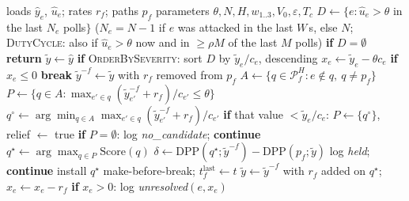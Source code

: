 \begin{algorithm}[t]
\caption{ResilientSDN, one polling interval $t$}\label{alg:rsdn}
\begin{algorithmic}[1]
\Require loads $\hat y_e$, $\hat u_e$; rates $r_f$; paths $p_f$
\Statex \hspace{\algorithmicindent}parameters $\theta,N,H,w_{1..3},V_0,\varepsilon,T_c$
\State $D\gets\{e:\hat u_e>\theta$ in the last $N_e$ polls$\}$ 
\Statex \hspace{\algorithmicindent}($N_e=N-1$ if $e$ was attacked in the last $W$\,s, else $N$;
\Statex \hspace{\algorithmicindent}\textsc{DutyCycle}: also if $\hat u_e>\theta$ now and in $\ge\rho M$ of the last $M$ polls)
\State \textbf{if} $D=\emptyset$ \textbf{return}
\State $\tilde y\gets\hat y$ 
\State \textbf{if} \textsc{OrderBySeverity}: sort $D$ by $\tilde y_e/c_e$, descending
  \State $x_e\gets\tilde y_e-\theta c_e$ 
    \State \textbf{if} $x_e\le 0$ \textbf{break}
    \State $\tilde y^{-f}\gets\tilde y$ with $r_f$ removed from $p_f$
    \State $A\gets\{q\in\mathcal{P}_f^H: e\notin q,\ q\neq p_f\}$
    \State $P\gets\{q\in A:\max_{e'\in q}(\tilde y^{-f}_{e'}+r_f)/c_{e'}\le\theta\}$
    \Statex \hfill{}
     \label{alg:fallback}
      \State $q^\circ\gets\arg\min_{q\in A}\max_{e'\in q}(\tilde y^{-f}_{e'}+r_f)/c_{e'}$
      \State \textbf{if} that value $<\tilde y_e/c_e$: $P\gets\{q^\circ\}$, relief $\gets$ true
    \EndIf
    \State \textbf{if} $P=\emptyset$: log \textit{no\_candidate}; \textbf{continue}
    \State $q^\star\gets\arg\max_{q\in P}\mathrm{Score}(q)$ 
    \State $\delta\gets\mathrm{DPP}(q^\star;\tilde y^{-f})-\mathrm{DPP}(p_f;\tilde y)$
      \State log \textit{held}; \textbf{continue} 
    \EndIf
    \State install $q^\star$ make-before-break; $t_f^{\mathrm{last}}\gets t$
    \State $\tilde y\gets\tilde y^{-f}$ with $r_f$ added on $q^\star$;\quad $x_e\gets x_e-r_f$
  \EndFor
  \State \textbf{if} $x_e>0$: log \textit{unresolved}$(e,x_e)$
\EndFor
\end{algorithmic}
\end{algorithm}
